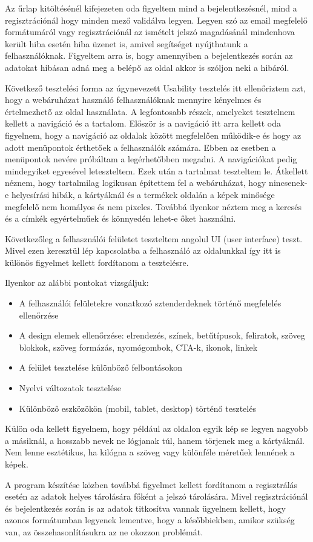 Az űrlap kitöltésénél kifejezeten oda figyeltem mind a bejelentkezésnél, mind a regisztrációnál hogy minden mező validálva legyen. Legyen szó az email megfelelő formátumáról vagy regisztrációnál az ismételt jelszó magadásánál mindenhova került hiba esetén hiba üzenet is, amivel segítséget nyújthatunk a felhasználóknak. Figyeltem arra is, hogy amennyiben a bejelentkezés során az adatokat hibásan adná meg a belépő az oldal akkor is szóljon neki a hibáról.

Következő tesztelési forma az úgynevezett Usability tesztelés itt ellenőriztem azt, hogy a webáruházat használó felhasználóknak mennyire kényelmes és értelmezhető az oldal használata. A legfontosabb részek, amelyeket tesztelnem kellett a navigáció és a tartalom. Először is a navigáció itt arra kellett oda figyelnem, hogy a navigáció az oldalak között megfelelően működik-e és hogy az adott menüpontok érthetőek a felhasználók számára. Ebben az esetben a menüpontok nevére próbáltam a legérhetőbben megadni. A navigációkat pedig mindegyiket egyesével leteszteltem. Ezek után a tartalmat teszteltem le. Átkellett néznem, hogy tartalmilag logikusan építettem fel a webáruházat, hogy nincsenek-e helyesírási hibák, a kártyáknál és a termékek oldalán a képek minősége megfelelő nem homályos és nem pixeles. Továbbá ilyenkor néztem meg a keresés és a címkék egyértelműek és könnyedén lehet-e őket használni.

Következőleg a felhasználói felületet teszteltem angolul UI (user interface) teszt. Mivel ezen keresztül lép kapcsolatba a felhasználó az oldalunkkal így itt is különös figyelmet kellett fordítanom a tesztelésre.

Ilyenkor az alábbi pontokat vizsgáljuk:
\begin{itemize}
    \item A felhasználói felületekre vonatkozó sztenderdeknek történő megfelelés ellenőrzése
    \item A design elemek ellenőrzése: elrendezés, színek, betűtípusok, feliratok, szöveg blokkok, szöveg formázás, nyomógombok, CTA-k, ikonok, linkek
    \item A felület tesztelése különböző felbontásokon
    \item Nyelvi változatok tesztelése
    \item Különböző eszközökön (mobil, tablet, desktop) történő tesztelés
\end{itemize}

Külön oda kellett figyelnem, hogy például az oldalon egyik kép se legyen nagyobb a másiknál, a hosszabb nevek ne lógjanak túl, hanem törjenek meg a kártyáknál. Nem lenne esztétikus, ha kilógna a szöveg vagy különféle méretűek lennének a képek. 

A program készítése közben továbbá figyelmet kellett fordítanom a regisztrálás esetén az adatok helyes tárolására főként a jelszó tárolására. Mivel regisztrációnál és bejelentkezés során is az adatok titkosítva vannak ügyelnem kellett, hogy azonos formátumban legyenek lementve, hogy a későbbiekben, amikor szükség van, az összehasonlításukra az ne okozzon problémát.
